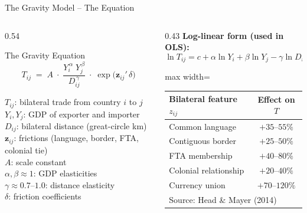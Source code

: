\documentclass[aspectratio=169]{beamer}
\begin{document}
\begin{frame}{The Gravity Model -- The Equation}
\begin{columns}[T]
\begin{column}{0.54\textwidth}
\begin{block}{The Gravity Equation}
\[T_{ij} \;=\; A\;\cdot\;\frac{Y_i^{\,\alpha}\;Y_j^{\,\beta}}{D_{ij}^{\,\gamma}} \;\cdot\; \exp\!\bigl(\mathbf{z}_{ij}'\,\delta\bigr)\]
\end{block}
\vspace{0.2em}
\begin{varbox}
\footnotesize
$T_{ij}$: bilateral trade from country $i$ to $j$\\
$Y_i, Y_j$: GDP of exporter and importer\\
$D_{ij}$: bilateral distance (great-circle km)\\
$\mathbf{z}_{ij}$: frictions (language, border, FTA, colonial tie)\\
$A$: scale constant\\
$\alpha,\beta\approx 1$: GDP elasticities\\
$\gamma\approx 0.7$–$1.0$: distance elasticity\\
$\delta$: friction coefficients
\end{varbox}
\end{column}
\begin{column}{0.43\textwidth}
\textbf{Log-linear form (used in OLS):}
\[\ln T_{ij} = c + \alpha\ln Y_i + \beta\ln Y_j - \gamma\ln D_{ij} + \mathbf{z}_{ij}'\delta\]
\vspace{0.2em}
\begin{adjustbox}{max width=\columnwidth}
\begin{tabular}{lc}
\toprule
\textbf{Bilateral feature $z_{ij}$} & \textbf{Effect on $T$}\\
\midrule
Common language    & $+35$–$55\%$\\
Contiguous border  & $+25$–$50\%$\\
FTA membership     & $+40$–$80\%$\\
Colonial relationship & $+20$–$40\%$\\
Currency union     & $+70$–$120\%$\\
\bottomrule
\multicolumn{2}{l}{\tiny Source: Head \& Mayer (2014)}
\end{tabular}
\end{adjustbox}
\end{column}
\end{columns}
\end{frame}
\end{document}
